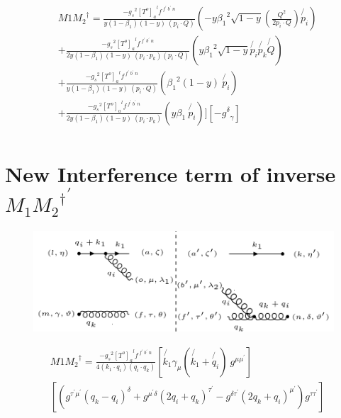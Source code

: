 \begin{equation}
\begin{split}
&M1{M_2}^{\dagger}=\frac{-{g_s}^2 {[T^{o}]_a}^{l} f^{\:f^{\prime}\: b^{\prime}\:n}}{y(1-\beta_1) (1-y)\:(p_i \cdot Q)}(- y{\beta_1}^2 \sqrt{1-y}(\frac{Q^2}{2p_i \cdot Q})\not{p_i})\\
&+\frac{-{g_s}^2 {[T^{o}]_a}^{l} f^{\:f^{\prime}\: b^{\prime}\:n}}{2y(1-\beta_1) (1-y)\:(p_i \cdot p_k)(p_i \cdot Q)}(y{\beta_1}^2 \sqrt{1-y}\not{p_i}\not{p_k}\not{Q})\\
&+\frac{-{g_s}^2 {[T^{o}]_a}^{l} f^{\:f^{\prime}\: b^{\prime}\:n}}{y(1-\beta_1) (1-y)\:(p_i \cdot Q)}({\beta_1}^2 (1-y)\:\not{p_i})\\
&+\frac{-{g_s}^2 {[T^{o}]_a}^{l} f^{\:f^{\prime}\: b^{\prime}\:n}}{2y(1-\beta_1) (1-y)\:(p_i \cdot p_k)}(y\beta_1\:\not{p_i})][-{g^{\delta}}_{\gamma}]\\
\end{split}
\end{equation}

\section{New Interference term of inverse ${M_1{M_2}^{\dagger}}^{\prime}$}
\begin{figure}[ht!]
\centering
\includegraphics[scale=0.7]{images/GQ/M1M2DaggerGluonNew.png}
\end{figure}

\begin{equation}
\begin{split}
&M1{M_2}^{\dagger}=\frac{-{g_s}^2 {[T^{o}]_a}^{l} f^{\:f^{\prime}\: b^{\prime}\:n}}{4(k_1 \cdot q_i)(q_i \cdot q_k)}[\not{k_1}{\gamma}_{\mu}(\not{k_1}+\not{q_i})\:g^{\mu \mu^{\prime}}]\\
&[ (g^{{{\tau}^{\prime}}{{\mu}^{\prime}}}(q_k-q_i)^{\delta}+g^{{{\mu}^{\prime}}{{\delta}}}(2q_i +q_k)^{{\tau}^{\prime}}-g^{\delta{{\tau}^{\prime}}}(2q_k+q_i)^{{\mu}^{\prime}})g^{\tau \tau^{\prime}}]\\
\end{split}
\end{equation}

